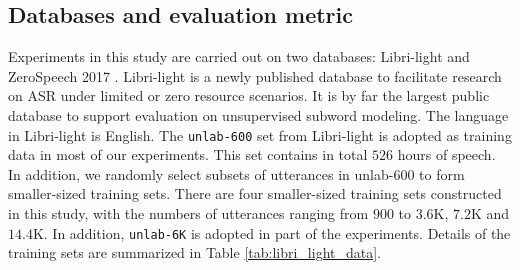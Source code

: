 \documentclass[a4paper]{article}
\begin{document}
\subsection{Databases and evaluation metric}
Experiments in this study are carried out on two databases: Libri-light \cite{kahn2019librilight} and ZeroSpeech 2017 \cite{dunbar2017zero}. Libri-light is a newly published   database to facilitate research on ASR under limited or zero resource scenarios. It is by far the largest public database to support evaluation on unsupervised subword modeling. The language in Libri-light is English. The \texttt{unlab-600} set from Libri-light is adopted as training data in most of our experiments. This set contains 
in total $526$ hours of speech. In addition, we randomly select subsets of utterances in unlab-600   to form smaller-sized training sets. There are four smaller-sized training sets constructed in this study, with the numbers of utterances ranging from $900$ to $3.6$K, $7.2$K and $14.4$K. In addition, \texttt{unlab-6K} is adopted in part of the experiments. Details of the training sets are summarized in Table \ref{tab:libri_light_data}.
\begin{table}[!tbp]
\renewcommand\arraystretch{1}
\centering
\caption{Libri-light training data and its subsets.}
\label{tab:libri_light_data}
\end{table}
\end{document}
